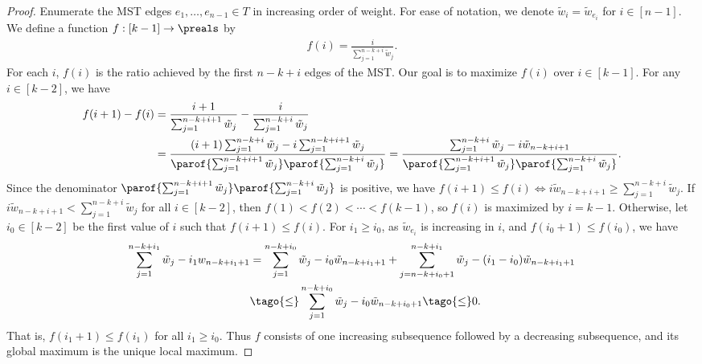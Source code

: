 \documentclass[11pt]{article}
\numberwithin{equation}{section}
\theoremstyle{definition}
\theoremstyle{plain}
\newcommand{\apxweight}{\tilde{w}}%
\newcommand{\apxweightof}[1]{\apxweight_{#1}}%
\begin{document}
%
%
%
%
\begin{proof}%
  \newcommand{\sumweight}[1]{\sum_{j=1}^{n - k + #1} \apxweightof{j}}%
  Enumerate the MST edges $e_1,\dots,e_{n-1} \in T$ in increasing
  order of weight.  For ease of notation, we denote
  $\apxweightof{i} = \apxweightof{e_i}$ for $i \in [n-1]$. We define a
  function $f: [k-1] \to \preals$ by
  \begin{align*}
    f(i) = \frac{i}{\sumweight{i}}.
  \end{align*}
  For each $i$, $f(i)$ is the ratio achieved by the first $n - k + i$
  edges of the MST. Our goal is to maximize $f(i)$ over $i \in
  [k-1]$. For any $i \in [k-2]$, we have
  \begin{align*}
    f(i+1) - f(i)               %
    &=
      \frac{i+1}{\sumweight{i + 1}} -
      \frac{i}{\sumweight{i}} %
    \\
    &=                           %
      \frac{                     %
      (i+1) \sumweight{i} - i \sumweight{i + 1}                        %
      }{                        %
      \parof{\sumweight{i+1}}\parof{\sumweight{i}}                    %
      } %
          =
          \frac{\sumweight{i}- i \apxweightof{n - k + i + 1}}{\parof{\sumweight{i+1}}\parof{\sumweight{i}}}.
  \end{align*}
  Since the denominator $\parof{\sumweight{i+1}}\parof{\sumweight{i}}$
  is positive, we have
  \begin{math}
    f(i+1) \leq f(i) \iff i \apxweightof{n - k + i + 1} \geq
    \sumweight{i}.
  \end{math}
  If $i \apxweightof{n - k + i + 1} < \sumweight{i}$ for all
  $i \in [k-2]$, then $f(1) < f(2) < \cdots < f(k-1)$, so $f(i)$ is
  maximized by $i = k - 1$. Otherwise, let $i_0 \in [k-2]$ be the
  first value of $i$ such that $f(i+1) \leq f(i)$. For $i_1 \geq i_0$,
  as \tagr $\apxweightof{e_i}$ is increasing in $i$, and \tagr
  $f(i_0 + 1) \leq f(i_0)$, we have
  \begin{align*}
    \sumweight{i_1} - i_1 w_{n - k + i_1 + 1} %
    &=                                                     %
      \sumweight{i_0} - i_0 \apxweightof{n-k+i_1 + 1} + \sum_{j=n-k+i_0 + 1}^{n
      - k + i_1} \apxweightof{j} - (i_1 - i_0) \apxweightof{n-k+i_1+1} %
    \\
    &\tago{\leq}                          %
      \sumweight{i_0} - i_0 \apxweightof{n - k + i_0 + 1} %
      \tago{\leq}                      %
      0.
  \end{align*}
  That is, $f(i_1 + 1) \leq f(i_1)$ for all $i_1 \geq i_0$. Thus $f$
  consists of one increasing subsequence followed by a decreasing
  subsequence, and its global maximum is the unique local maximum.
\end{proof}
\end{document}
